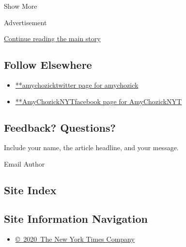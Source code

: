Show More

Advertisement

\protect\hyperlink{after-mid2}{Continue reading the main story}

\hypertarget{follow-elsewhere}{%
\subsection{Follow Elsewhere}\label{follow-elsewhere}}

\begin{itemize}
\tightlist
\item
  \href{https://twitter.com/amychozick}{**amychozicktwitter page for
  amychozick}
\item
  \href{https://www.facebook.com/AmyChozickNYT}{**AmyChozickNYTfacebook
  page for AmyChozickNYT}
\end{itemize}

\hypertarget{feedback-questions}{%
\subsection{Feedback? Questions?}\label{feedback-questions}}

Include your name, the article headline, and your message.

Email Author

\hypertarget{site-index}{%
\subsection{Site Index}\label{site-index}}

\hypertarget{site-information-navigation}{%
\subsection{Site Information
Navigation}\label{site-information-navigation}}

\begin{itemize}
\tightlist
\item
  \href{https://help.nytimes.com/hc/en-us/articles/115014792127-Copyright-notice}{©~2020~The
  New York Times Company}
\end{itemize}

